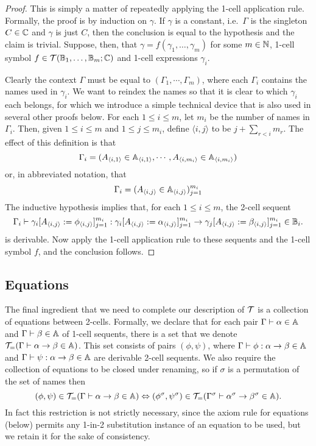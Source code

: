 \documentclass{robinthesisdraft}
\begin{document}
\begin{proof}
	\def\<#1>{\langle#1\rangle}
	This is simply a matter of repeatedly applying the 1-cell application
	rule. Formally,
	the proof is by induction on $\gamma$.
	If $\gamma$ is a constant, i.e.\ $\Gamma$ is the singleton $C\in\mathbb{C}$ and $\gamma$
	is just $C$, then the conclusion is equal to the hypothesis and the claim
	is trivial. Suppose, then, that $\gamma = f(\gamma_{1}, \dots, \gamma_{m})$ for some
	$m\in\mathbb{N}$, 1-cell symbol $f\in{\mathcal{T}}(\mathbb{B}_{1}, \dots, \mathbb{B}_{m}; \mathbb{C})$ and
	1-cell expressions $\gamma_{i}$.
	
	Clearly the context $\Gamma$ must be equal to
	$(\Gamma_{1}, \cdots, \Gamma_{m})$, where each $\Gamma_{i}$ contains
	the names used in $\gamma_{i}$.
	We want to reindex the names so that it is clear to which $\gamma_{i}$
	each belongs, for which we introduce a simple technical device that is
	also used in several other proofs below.
	For each $1\leq i\leq m$, let $m_{i}$ be the number of names in
	$\Gamma_{i}$. Then, given $1\leq i \leq m$ and $1\leq j\leq m_{i}$,
	define $\<i,j>$ to be $j+\sum_{r<i}m_{r}$. The effect of this definition
	is that
	\[
		\Gamma_{i} = (A_{\<i,1>} \in \A_{\<i,1>}, \cdots, A_{\<i,m_{i}>} \in \A_{\<i,m_{i}>})
	\]
	or, in abbreviated notation, that
	\[
		\Gamma_{i} = (A_{\<i,j>} \in \A_{\<i,j>})_{j=1}^{m_{i}}
	\]
	The inductive hypothesis implies that, for each $1\leq i\leq m$, the
	2-cell sequent
	\[
	\Gamma_{i}\proves \gamma_{i}[A_{\<i,j>} := \phi_{\<i,j>}]_{j=1}^{m_{i}}
		: \gamma_{i}[A_{\<i,j>} := \alpha_{\<i,j>}]_{j=1}^{m_{i}}
		\to \gamma_{j}[A_{\<i,j>} := \beta_{\<i,j>}]_{j=1}^{m_{i}}
		\in\CB_{i}.
	\]
	is derivable. Now apply the 1-cell application rule to these sequents and
	the 1-cell symbol $f$, and the conclusion follows.
\end{proof}

\subsection{Equations}
The final ingredient that we need to complete our description
of ${\mathcal{T}}$ is a collection of equations between 2-cells.
Formally, we declare that for each pair
$\Gamma\vdash\alpha\in\mathbb{A}$ and $\Gamma\vdash\beta\in\mathbb{A}$ of
1-cell sequents, there is a set that we denote
${\mathcal{T}}_{=}(\Gamma\vdash \alpha\to\beta\in\mathbb{A})$. This set consists
of pairs $(\phi,\psi)$,
where $\Gamma\vdash\phi:\alpha\to\beta\in\mathbb{A}$ and
$\Gamma\vdash\psi:\alpha\to\beta\in\mathbb{A}$ are derivable
2-cell sequents.
%
We also require the collection of equations to be closed under renaming,
so if $\sigma$ is a permutation of the set of names then
\[
	(\phi,\psi)\in{\mathcal{T}}_{=}(\Gamma\vdash \alpha\to\beta\in\mathbb{A})
	\Leftrightarrow 
	(\phi^{\sigma},\psi^{\sigma})\in{\mathcal{T}}_{=}(\Gamma^{\sigma}\vdash \alpha^{\sigma}\to\beta^{\sigma}\in\mathbb{A}).
\]
In fact this restriction is not strictly necessary, since the
axiom rule for equations (below) permits any 1-in-2 substitution instance
of an equation to be used, but we retain it for the sake of
consistency.
\end{document}
